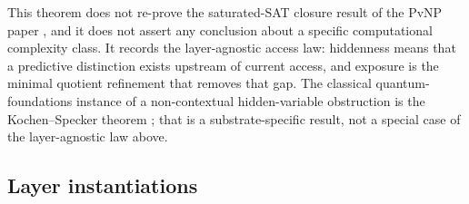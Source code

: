 \documentclass[11pt]{article}
\theoremstyle{definition}
\begin{document}
This theorem does not re-prove the saturated-SAT closure result of
the PvNP paper \citep{Tsiokos2026PvNP}, and it does not assert any
conclusion about a specific computational complexity class.  It
records the layer-agnostic access law: hiddenness means that a
predictive distinction exists upstream of current access, and
exposure is the minimal quotient refinement that removes that gap.
The classical quantum-foundations instance of a non-contextual
hidden-variable obstruction is the Kochen--Specker theorem
\citep{KochenSpecker1967Hidden}; that is a substrate-specific
result, not a special case of the layer-agnostic law above.

\subsection*{Layer instantiations}\label{layer-inst:F13a}
\end{document}
